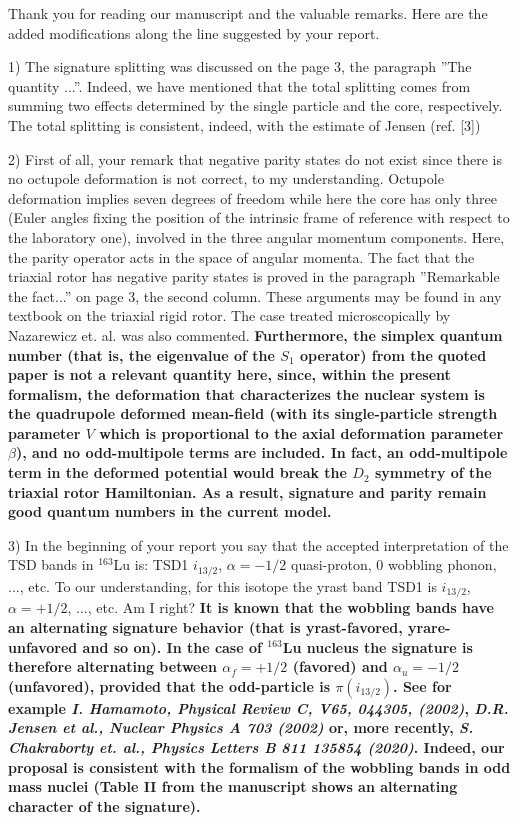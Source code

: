\documentclass[11pt,a4paper]{article}
\begin{document}
Thank you for reading our manuscript and the valuable remarks. Here are the added modifications along the line suggested by your report.

1) The signature splitting was discussed on the page 3, the paragraph ”The quantity ...”. Indeed, we have mentioned that the total splitting comes from summing two effects determined by the single particle and the core, respectively. The total splitting is consistent, indeed, with the estimate of Jensen (ref. [3])

2) First of all, your remark that negative parity states do not exist since there is no octupole deformation is not correct, to my understanding. Octupole deformation implies seven degrees of freedom while here the core has only three (Euler angles fixing the position of the intrinsic frame of reference with respect to the laboratory one), involved in the three angular momentum components. Here, the parity operator acts in the space of angular momenta. The fact that the triaxial rotor has negative parity states is proved in the paragraph ”Remarkable the fact...” on page 3, the second column. These arguments may be found in any textbook on the triaxial rigid rotor. The case treated microscopically by Nazarewicz et. al. was also commented. \textbf{Furthermore, the simplex quantum number (that is, the eigenvalue of the $S_1$ operator) from the quoted paper is not a relevant quantity here, since, within the present formalism, the deformation that characterizes the nuclear system is the quadrupole deformed mean-field (with its single-particle strength parameter $V$ which is proportional to the axial deformation parameter $\beta$), and no odd-multipole terms are included. In fact, an odd-multipole term in the deformed potential would break the $D_2$ symmetry of the triaxial rotor Hamiltonian. As a result, signature and parity remain good quantum numbers in the current model.}

3) In the beginning of your report you say that the accepted interpretation of the TSD bands in $^{163}$Lu is: TSD1 $i_{13/2}$, $\alpha = -1/2$ quasi-proton, 0 wobbling phonon, ..., etc. To our understanding, for this isotope the yrast band TSD1 is $i_{13/2}$,  $\alpha= +1/2$, ..., etc. Am I right? 
\textbf{It is known that the wobbling bands have an alternating signature behavior (that is yrast-favored, yrare-unfavored and so on). In the case of $^{163}$Lu nucleus the signature is therefore alternating between $\alpha_f=+1/2$ (favored) and $\alpha_u=-1/2$ (unfavored), provided that the odd-particle is $\pi(i_{13/2})$. See for example \emph{I. Hamamoto, Physical Review C, V65, 044305, (2002)}, \emph{D.R. Jensen et al., Nuclear Physics A 703 (2002)} or, more recently, \emph{S. Chakraborty et. al., Physics Letters B 811 135854 (2020)}. Indeed, our proposal is consistent with the formalism of the wobbling bands in odd mass nuclei (Table II from the manuscript shows an alternating character of the signature).}
\end{document}
